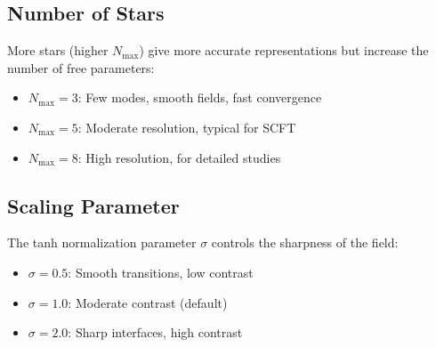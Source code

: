 \subsection{Number of Stars}

More stars (higher $N_{\text{max}}$) give more accurate representations but increase the number of free parameters:

\begin{itemize}
    \item $N_{\text{max}} = 3$: Few modes, smooth fields, fast convergence
    \item $N_{\text{max}} = 5$: Moderate resolution, typical for SCFT
    \item $N_{\text{max}} = 8$: High resolution, for detailed studies
\end{itemize}

\subsection{Scaling Parameter}

The tanh normalization parameter $\sigma$ controls the sharpness of the field:

\begin{itemize}
    \item $\sigma = 0.5$: Smooth transitions, low contrast
    \item $\sigma = 1.0$: Moderate contrast (default)
    \item $\sigma = 2.0$: Sharp interfaces, high contrast
\end{itemize}
